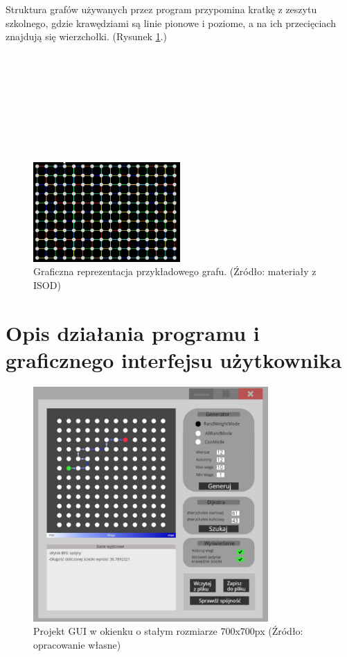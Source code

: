 \documentclass{article}
\begin{document}
Struktura grafów używanych przez program przypomina kratkę z zeszytu szkolnego, gdzie krawędziami są linie pionowe i poziome, a na ich przecięciach znajdują się wierzchołki. (Rysunek \ref{fig:graf}.)\\\\\\\\\\\\\\\\\\

\begin{figure}[h]
\centering
\includegraphics[width=0.5\textwidth]{grafik.jpg}
\caption{\label{fig:graf}Graficzna reprezentacja przykładowego grafu. (Źródło: materiały z ISOD)}
\end{figure}

\section{Opis działania programu i graficznego interfejsu użytkownika}

\begin{figure}[h]
\centering
\includegraphics[width=0.8\textwidth]{gui3.jpg}
\caption{\label{fig:gui}Projekt GUI w okienku o stałym rozmiarze 700x700px (Źródło: opracowanie własne)}
\end{figure}
\end{document}

